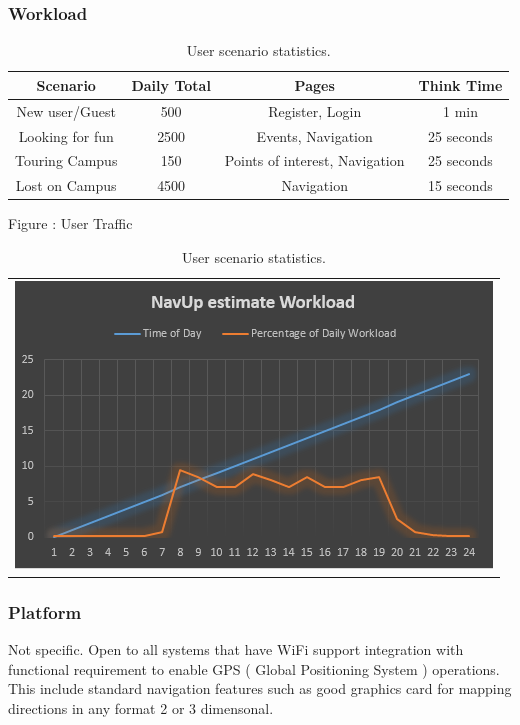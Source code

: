 \documentclass[a4paper,12pt]{report}
\begin{document}
		\subsubsection{Workload}
		\begin{table}[h!]
			\centering
			\caption{User scenario statistics.}
			\label{tab:table1}
			\begin{tabular}{|c|c|c|c|}
				 \hline
				Scenario & Daily Total & Pages & Think Time \\
				\hline
				New user/Guest & 500 & Register, Login & 1 min \\
				\hline
				Looking for fun & 2500 & Events, Navigation & 25 seconds\\
				\hline
				Touring Campus & 150 & Points of interest, Navigation & 25 seconds \\
				\hline
				Lost on Campus & 4500 & Navigation & 15 seconds\\
				\hline
			\end{tabular}
			
			\bigskip
			Figure : User Traffic \\
			\begin{tabular}{l}
				
				\includegraphics{workLoad.png}
				
			\end{tabular}
		
		\end{table}
	
		
		\subsubsection{Platform}
		 Not specific. Open to all systems that have WiFi support integration with functional requirement to enable 
		 GPS ( Global Positioning System ) operations. This include standard navigation features such as good graphics 
		 card for mapping directions in any format 2 or 3 dimensonal. 
\end{document}
